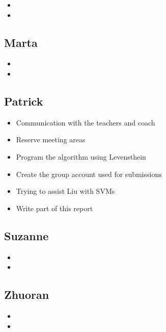 \documentclass{article}
\begin{document}
\begin{itemize}
\item
\item
\end{itemize}

\subsection{Marta}

\begin{itemize}
\item
\item
\end{itemize}

\subsection{Patrick}

\begin{itemize}
\item Communication with the teachers and coach
\item Reserve meeting areas
\item Program the algorithm using Levensthein
\item Create the group account used for submissions
\item Trying to assist Liu with SVMs
\item Write part of this report
\end{itemize}

\subsection{Suzanne}

\begin{itemize}
\item
\item
\end{itemize}

\subsection{Zhuoran}

\begin{itemize}
\item
\item
\end{itemize}
\end{document}
